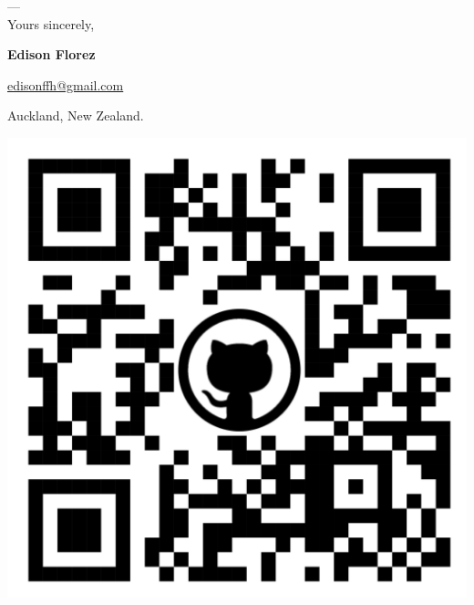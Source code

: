 \vfill
\begin{minipage}[c]{.75\textwidth}
    ---\\
    Yours sincerely,

    \vspace*{4mm}

    \textbf{Edison Florez}

    \href{mailto:edisonffh@gmail.com}{edisonffh@gmail.com}


    Auckland, New Zealand.
\end{minipage}
\begin{minipage}[c]{.2\textwidth}
    \centering
    \href{https://github.com/e-florez/}{
        \includegraphics[scale=0.025]{figs/qrcode_github_page.png}
    }
\end{minipage}

